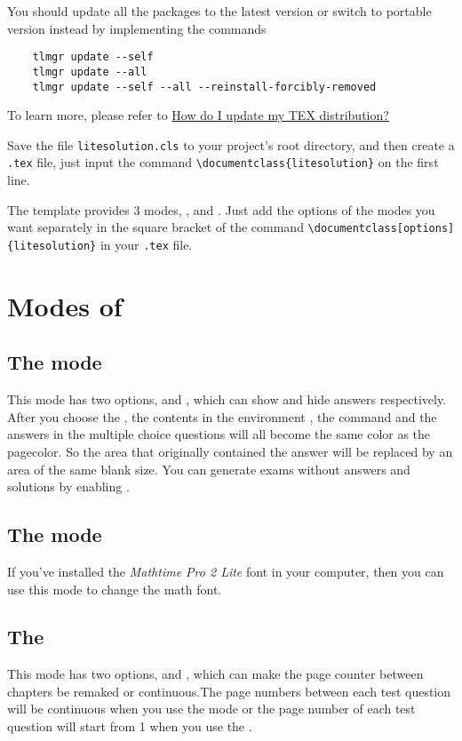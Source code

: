 You should update all the packages to the latest version or switch to portable version instead by implementing the commands 
\begin{verbatim}
    tlmgr update --self
    tlmgr update --all
    tlmgr update --self --all --reinstall-forcibly-removed
\end{verbatim}

To learn more, please refer to \href{https://tex.stackexchange.com/questions/55437/how-do-i-update-my-tex-distribution}{How do I update my TEX distribution?}

Save the file \verb|litesolution.cls| to your project's root directory, and then create a \verb|.tex| file, just input the command \verb|\documentclass{litesolution}| on the first line.

The template provides 3 modes, ,  and . Just add the options of the modes you want separately in the square bracket of the command \verb|\documentclass[options]{litesolution}| in your \verb|.tex| file.

\section{Modes of }
\subsection{The  mode}
This mode has two options,  and , which can show and hide answers respectively. After you choose the , the contents in the environment , the command  and the answers in the multiple choice questions will all become the same color as the pagecolor. So the area that originally contained the answer will be replaced by an area of the same blank size. You can generate exams without answers and solutions by enabling .

\subsection{The  mode}
If you've installed the \emph{Mathtime Pro 2 Lite} font in your computer, then you can use this mode to change the math font.

\subsection{The }
This mode has two options,  and , which can make the page counter between chapters be remaked or continuous.The page numbers between each test question will be continuous when you use the  mode or the page number of each test question will start from 1 when you use the .


